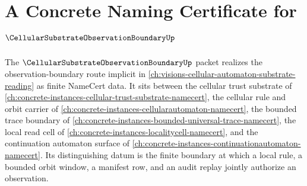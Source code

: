 \chapter{A Concrete Naming Certificate for $\CellularSubstrateObservationBoundaryUp$}
\label{ch:concrete-instances-cellular-substrate-observation-boundary-namecert}

The $\CellularSubstrateObservationBoundaryUp$ packet realizes the observation-boundary route implicit in \autoref{ch:visions-cellular-automaton-substrate-reading} as finite NameCert data. It sits between the cellular trust substrate of \autoref{ch:concrete-instances-cellular-trust-substrate-namecert}, the cellular rule and orbit carrier of \autoref{ch:concrete-instances-cellularautomaton-namecert}, the bounded trace boundary of \autoref{ch:concrete-instances-bounded-universal-trace-namecert}, the local read cell of \autoref{ch:concrete-instances-localitycell-namecert}, and the continuation automaton surface of \autoref{ch:concrete-instances-continuationautomaton-namecert}. Its distinguishing datum is the finite boundary at which a local rule, a bounded orbit window, a manifest row, and an audit replay jointly authorize an observation.



